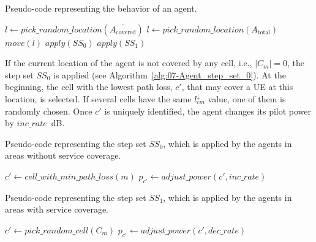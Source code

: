 \begin{algorithm}
\centering

\caption{Pseudo-code representing the behavior of an agent.\textit{\label{alg:07-Agent-behavior}}}


\begin{algorithmic}
\Repeat
		\State $l \gets pick\_random\_location(\overline{A_{\mathrm{covered}}})$
	\Else
		\State $l \gets pick\_random\_location(A_{\mathrm{total}})$
	\EndIf
	\State $move(l)$
		\State $apply(SS_{0})$
	\Else
			\State $apply(SS_{1})$
		\EndIf
	\EndIf
{}
\end{algorithmic}
\end{algorithm}


If the current location of the agent is not covered by any cell, i.e.,
$\vert C_{m}\vert=0$, the step set $SS_{0}$ is applied (see Algorithm~\ref{alg:07-Agent_step_set_0}).
At the beginning, the cell with the lowest path loss, $c'$, that
may cover a UE at this location, is selected. If several cells have
the same $l_{cm}^{\downarrow}$ value, one of them is randomly chosen.
Once $c'$ is uniquely identified, the agent changes its pilot power
by $inc\_rate$~dB.

\begin{algorithm}
\centering

\caption{Pseudo-code representing the step set $SS_{0}$, which is applied
by the agents in areas without service coverage.\textit{\label{alg:07-Agent_step_set_0}}}


\begin{algorithmic}
\Repeat
	\State $c'\gets cell\_with\_min\_path\_loss(m)$
	\State $p_{c'}\gets adjust\_power(c',inc\_rate)$
\end{algorithmic}
\end{algorithm}


\begin{algorithm}
\centering

\caption{Pseudo-code representing the step set $SS_{1}$, which is applied
by the agents in areas with service coverage.\label{alg:07-Agent_step_set_1}}


\begin{algorithmic}
\Repeat
	\State $c'\gets pick\_random\_cell(C_{m})$
	\State $p_{c'}\gets adjust\_power(c',dec\_rate)$
\end{algorithmic}
\end{algorithm}


